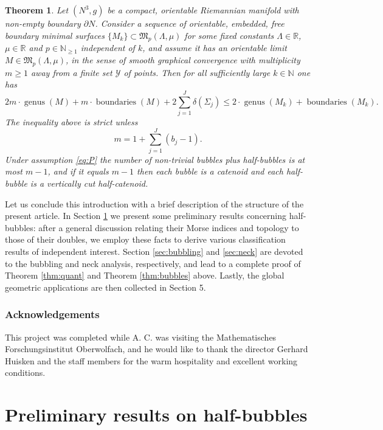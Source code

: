 \documentclass[10pt]{amsart}
\let\mathcal\mathscr
\DeclareMathOperator{\boundaries}{boundaries}
\DeclareMathOperator{\genus}{genus}
\newtheorem{thm}{Theorem}
\theoremstyle{definition}
\newcommand{\R}{\mathbb{R}}
\newcommand{\N}{\mathbb{N}}
\begin{document}
\begin{thm}\label{thm:lsc}
Let $(N^{3},g)$ be a compact, orientable Riemannian manifold with non-empty boundary $\partial N$.
Consider a sequence of orientable, embedded, free boundary minimal surfaces $\{M_k\}\subset \mathfrak{M}_p(\Lambda,\mu)$ for some fixed constants $\Lambda\in \R$, $\mu\in \R$ and $p\in\N_{\geq 1}$ independent of $k$, and assume it has an orientable limit
$M\in \mathfrak{M}_p(\Lambda,\mu)$, in the sense of smooth graphical convergence with multiplicity $m\geq 1$ away from a finite set $\mathcal{Y}$ of points.
Then for all sufficiently large $k\in\mathbb{N}$ one has
\begin{equation*}\label{eq:lsc}
2m\cdot \genus(M)+m\cdot \boundaries(M)
+2\sum_{j=1}^J\delta(\Sigma_j)
\leq 2 \cdot \genus(M_k)+\boundaries(M_k).
\end{equation*}
The inequality above is strict unless
\[
m=1+\sum_{j=1}^J(b_j-1).
\]
Under assumption \eqref{eq:P} the number of non-trivial bubbles plus half-bubbles is at most $m-1$, and if it equals $m-1$ then each bubble is a catenoid and each half-bubble is a vertically cut half-catenoid.
\end{thm}

Let us conclude this introduction with a brief description of the structure of the present article. In Section \ref{sec:prelim} we present some preliminary results concerning half-bubbles: after a general discussion relating their Morse indices and topology to those of their doubles, we employ these facts to derive various classification results of independent interest. Section \ref{sec:bubbling} and \ref{sec:neck} are devoted to the bubbling and neck analysis, respectively, and lead to a complete proof of Theorem \ref{thm:quant} and Theorem \ref{thm:bubbles} above. Lastly, the global geometric applications are then collected in Section 5.

\subsubsection*{Acknowledgements}
This project was completed while A. C. was visiting the Mathematisches Forschungsinstitut Oberwolfach, and he would like to thank the director Gerhard Huisken and the staff members for the warm hospitality and excellent working conditions.

\section{Preliminary results on half-bubbles}\label{sec:prelim}
\end{document}
